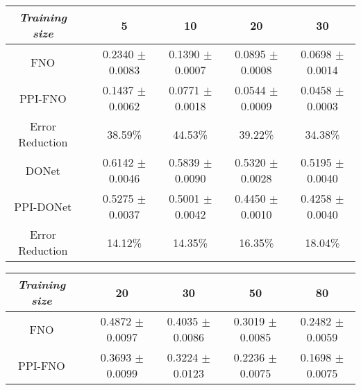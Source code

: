 \begin{table*}[htbp!]
\begin{subtable}{\textwidth}
\begin{tabular}{ccccc}
    \end{tabular}
    \end{subtable}
    \begin{subtable}{\textwidth}
    \caption{\small \textit{Poisson}}
    \label{tab:poisson}
    \small 
    \centering
    \begin{tabular}{cccccc}
        \hline
        \textit{Training size}      &  & {5}             & {10}         & {20}     & {30}     \\ \hline
        FNO                  &  & 0.2340 $\pm$ 0.0083	& 0.1390 $\pm$ 0.0007   & 0.0895 $\pm$ 0.0008   & 0.0698 $\pm$ 0.0014         \\
        PPI-FNO          &  & {0.1437} $\pm$ {0.0062}          & {0.0771} $\pm$ {0.0018}        & {0.0544} $\pm$ {0.0009} 		 & {0.0458} $\pm$ {0.0003}    \\
        Error Reduction          &  & 38.59\% & 44.53\%        & 39.22\%		 & 34.38\%   \\ \hline
        DONet             &  & 0.6142 $\pm$ 0.0046          & 0.5839 $\pm$ 0.0090      & 0.5320 $\pm$ 0.0028 	& 0.5195 $\pm$ 0.0040    \\
        PPI-DONet             &  & 0.5275 $\pm$ 0.0037        & 0.5001 $\pm$ 0.0042    	& 0.4450 $\pm$ 0.0010	& 0.4258 $\pm$ 0.0040  \\ 
        Error Reduction  &  & 14.12\%         & 14.35\%    	& 16.35\%	& 18.04\%  \\ \hline
    \end{tabular}
    \end{subtable}
    \begin{subtable}{\textwidth}
     \caption{\small \textit{Advection}}
    \label{tab:advection}
        \small 
        \centering
    \begin{tabular}{cccccc}
        \hline
        \textit{Training size}      &  & {20}             & {30}         & {50}     & {80}     \\ \hline
        FNO                  &  & 0.4872 $\pm$ 0.0097	& 0.4035 $\pm$ 0.0086   & 0.3019 $\pm$ 0.0085   & 0.2482 $\pm$ 0.0059        \\
        PPI-FNO          &  & {0.3693} $\pm$ {0.0099}          & {0.3224} $\pm$ {0.0123}        & {0.2236} $\pm$ {0.0075} 		 & {0.1698} $\pm$ {0.0075}    \\

\end{tabular}
\end{subtable}
\end{table*}
